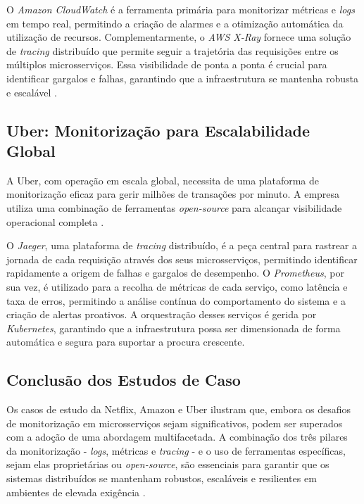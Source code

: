 O \textit{Amazon CloudWatch} é a ferramenta primária para monitorizar métricas e \textit{logs} em tempo real, permitindo a criação de alarmes e a otimização automática da utilização de recursos. Complementarmente, o \textit{AWS X-Ray} fornece uma solução de \textit{tracing} distribuído que permite seguir a trajetória das requisições entre os múltiplos microsserviços. Essa visibilidade de ponta a ponta é crucial para identificar gargalos e falhas, garantindo que a infraestrutura se mantenha robusta e escalável \cite{Dragoni2017}.

\subsection{Uber: Monitorização para Escalabilidade Global}

A Uber, com operação em escala global, necessita de uma plataforma de monitorização eficaz para gerir milhões de transações por minuto. A empresa utiliza uma combinação de ferramentas \textit{open-source} para alcançar visibilidade operacional completa \cite{Newman2015}.

O \textit{Jaeger}, uma plataforma de \textit{tracing} distribuído, é a peça central para rastrear a jornada de cada requisição através dos seus microsserviços, permitindo identificar rapidamente a origem de falhas e gargalos de desempenho. O \textit{Prometheus}, por sua vez, é utilizado para a recolha de métricas de cada serviço, como latência e taxa de erros, permitindo a análise contínua do comportamento do sistema e a criação de alertas proativos. A orquestração desses serviços é gerida por \textit{Kubernetes}, garantindo que a infraestrutura possa ser dimensionada de forma automática e segura para suportar a procura crescente.

\subsection{Conclusão dos Estudos de Caso}

Os casos de estudo da Netflix, Amazon e Uber ilustram que, embora os desafios de monitorização em microsserviços sejam significativos, podem ser superados com a adoção de uma abordagem multifacetada. A combinação dos três pilares da monitorização - \textit{logs}, métricas e \textit{tracing} - e o uso de ferramentas específicas, sejam elas proprietárias ou \textit{open-source}, são essenciais para garantir que os sistemas distribuídos se mantenham robustos, escaláveis e resilientes em ambientes de elevada exigência \cite{Dragoni2017}.


